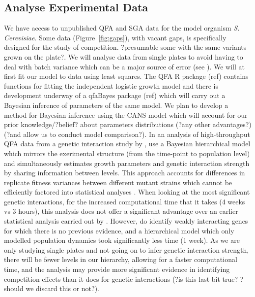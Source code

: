 \subsection{Analyse Experimental Data}
\label{sec:analyse-data}
We have access to unpublished QFA and SGA data for the model organism
\textit{S. Cerevisiae}. Some data (Figure~\ref{fig:gaps}), with vacant
gaps, is specifically designed for the study of
competition. ?presumable some with the same variants grown on the
plate?. We will analyse data from single plates to avoid having to
deal with batch variance which can be a major source of error (see
\citet{Baryshnikova2010}). We will at first fit our model to data
using least squares. The QFA R package (ref) contains functions for
fitting the independent logistic growth model and there is development
underway of a qfaBayes package (ref) which will carry out a Bayesian
inference of parameters of the same model. We plan to develop a method
for Bayesian inference using the CANS model which will account for our
prior knowledge/?belief? about parameters distributions (?any other
advantages?) (?and allow us to conduct model comparison?). In an
analysis of high-throughput QFA data from a genetic interaction study
by \citet{Addinall2011}, \citet{Heydari2016} use a Bayesian
hierarchical model which mirrors the exerimental structure (from the
time-point to population level) and simultaneously estimates growth
parameters and genetic interaction strength by sharing information
between levels. This approach accounts for differences in replicate
fitness variances between different mutant strains which cannot be
efficiently factored into statistical analyses
\citep{Heydari2016}. When looking at the most significant genetic
interactions, for the increased computational time that it takes (4
weeks vs 3 hours), this analysis does not offer a significant
advantage over an earlier statistical analysis carried out by
\citet{Addinall2011}. However, \citet{Heydari2016} do identify weakly
interacting genes for which there is no previous evidence, and a
hierarchical model which only modelled population dynamics took
significantly less time (1 week). As we are only studying single
plates and not going on to infer genetic interaction strength, there
will be fewer levels in our hierarchy, allowing for a faster
computational time, and the analysis may provide more significant
evidence in identifying competition effects than it does for genetic
interactions (?is this last bit true? ?should we discard this or
not?).

